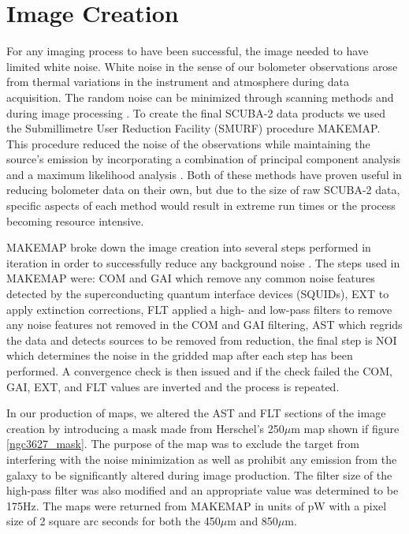 \section{Image Creation}

For any imaging process to have been successful, the image needed to have limited white noise.  White noise in the sense of our bolometer observations arose from thermal variations in the instrument and atmosphere during data acquisition. The random noise can be minimized through scanning methods and during image processing \citet{chapin2013}.  To create the final SCUBA-2 data products we used the Submillimetre User Reduction Facility (SMURF) procedure MAKEMAP.  This procedure reduced the noise of the observations while maintaining the source's emission by incorporating a combination of principal component analysis and a maximum likelihood analysis \citet{chapin2013}.  Both of these methods have proven useful in reducing bolometer data on their own, but due to the size of raw SCUBA-2 data, specific aspects of each method would result in extreme run times or the process becoming resource intensive.

MAKEMAP broke down the image creation into several steps performed in iteration in order to successfully reduce any background noise \citet{chapin2013}.  The steps used in MAKEMAP were:  COM and GAI which remove any common noise features detected by the superconducting quantum interface devices (SQUIDs), EXT to apply extinction corrections, FLT applied  a high- and low-pass filters to remove any noise features not removed in the COM and GAI filtering, AST which regrids the data and detects sources to be removed from reduction, the final step is NOI which determines the noise in the gridded map after each step has been performed.  A convergence check is then issued and if the check failed the COM, GAI, EXT, and FLT values are inverted and the process is repeated.

In our production of maps, we altered the AST and FLT sections of the image creation by introducing a mask made from Herschel's 250$\mu$m map shown if figure \ref{ngc3627_mask}.  The purpose of the map was to exclude the target from interfering with the noise minimization as well as prohibit any emission from the galaxy to be significantly altered during image production.  The filter size of the high-pass filter was also modified and an appropriate value was determined to be 175Hz.  The maps were returned from MAKEMAP in units of pW with a pixel size of 2 square arc seconds for both the 450$\mu$m and 850$\mu$m.

